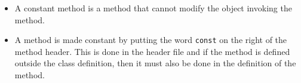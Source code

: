\begin{itemize}
\texttt{obj.m().m1()}

  \texttt{m1()} is not invoked by \texttt{obj}, but rather by a copy of
  \texttt{obj}.

\item A constant method is a method that cannot modify the object invoking
  the method.

\item A method is made constant by putting the word \texttt{const} on the
  right of the method header. This is done in the header file and if the
  method is defined outside the class definition, then it must also be
  done in the definition of the method.
\end{itemize}


